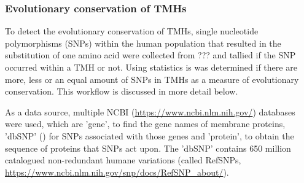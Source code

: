 \subsubsection{Evolutionary conservation of TMHs}


To detect the evolutionary conservation of TMHs, 
single nucleotide
polymorphisms (SNPs) within the human population
that resulted in the substitution of one amino acid were collected from ??? and tallied if
the SNP occurred within a TMH or not. Using statistics is was determined if there are more, less or an equal amount of SNPs in TMHs
as a measure of evolutionary conservation.
This workflow is discussed in more detail below.


As a data source, multiple
NCBI (\url{https://www.ncbi.nlm.nih.gov/}) databases were used,
which are 'gene', to find the gene names of membrane proteins, 
'dbSNP' (\cite{sherry2001dbsnp}) for SNPs associated with those genes
and 'protein', to obtain the sequence of proteins that SNPs act upon.
The 'dbSNP' contains 650 million 
catalogued non-redundant humane variations (called RefSNPs,
\url{https://www.ncbi.nlm.nih.gov/snp/docs/RefSNP_about/}).



